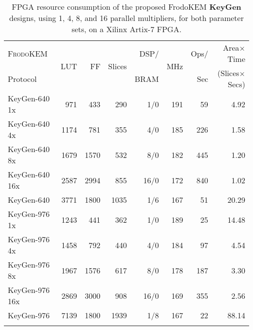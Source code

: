 \begin{table*}
\centering
\caption{FPGA resource consumption of the proposed FrodoKEM \textbf{KeyGen} designs, using 1, 4, 8, and 16 parallel multipliers, for both parameter sets, on a Xilinx Artix-7 FPGA.}\label{tab:keyresults}

\begin{tabular}{l r r r r r r r}
\hline \Tstrut
  \textsc{FrodoKEM} & \multirow{2}{*}{LUT} & \multirow{2}{*}{FF} & \multirow{2}{*}{Slices} & DSP/ & \multirow{2}{*}{MHz} & Ops/ & Area$\times$Time \\
Protocol &&&& BRAM && Sec & (Slices$\times$Secs) \\ \hline \Tstrut

KeyGen-640 1x & 971 & 433 & 290 & 1/0 & 191 & 59 & 4.92 \\
KeyGen-640 4x & 1174 & 781 & 355 & 4/0 & 185 & 226 & 1.58 \\
KeyGen-640 8x & 1679 & 1570 & 532 & 8/0 & 182 & 445  & 1.20 \\
KeyGen-640 16x & 2587 & 2994 & 855 & 16/0 & 172 & 840  & 1.02 \\ \hline \Tstrut
KeyGen-640 \cite{howe2018standard} & 3771 & 1800 & 1035 & 1/6 & 167 & 51 & 20.29 \\ \hline \Tstrut

KeyGen-976 1x & 1243 & 441 & 362 & 1/0 & 189 & 25 & 14.48 \\
KeyGen-976 4x & 1458 & 792 & 440 & 4/0 & 184 & 97 & 4.54 \\
KeyGen-976 8x & 1967 & 1576 & 617 & 8/0 & 178 & 187 & 3.30 \\
KeyGen-976 16x & 2869 & 3000 & 908 & 16/0 & 169 & 355 & 2.56 \\ \hline \Tstrut
KeyGen-976 \cite{howe2018standard} & 7139 & 1800 & 1939 & 1/8 & 167 & 22 & 88.14 \\ \hline \Tstrut

\end{tabular}%
\end{table*}

